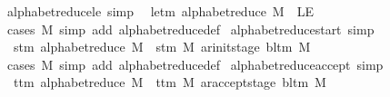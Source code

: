 \begin{isabellebody}
\endisatagproof
{\isafoldproof}%
%
\isadelimproof
\isanewline
%
\endisadelimproof
\isanewline
{}\isamarkupfalse%
\ alphabet{\isacharunderscore}{\kern0pt}reduce{\isacharunderscore}{\kern0pt}le\ {\isacharbrackleft}{\kern0pt}simp{\isacharbrackright}{\kern0pt}{\isacharcolon}{\kern0pt}\isanewline
\ \ {\isachardoublequoteopen}le{\isacharunderscore}{\kern0pt}tm\ {\isacharparenleft}{\kern0pt}alphabet{\isacharunderscore}{\kern0pt}reduce\ M{\isacharparenright}{\kern0pt}\ {\isacharequal}{\kern0pt}\ LE{}{\isachardoublequoteclose}\isanewline
%
\isadelimproof
\ \ %
\endisadelimproof
%
\isatagproof
{}\isamarkupfalse%
\ {\isacharparenleft}{\kern0pt}cases\ M{\isacharparenright}{\kern0pt}\ {\isacharparenleft}{\kern0pt}simp\ add{\isacharcolon}{\kern0pt}\ alphabet{\isacharunderscore}{\kern0pt}reduce{\isacharunderscore}{\kern0pt}def{\isacharparenright}{\kern0pt}%
\endisatagproof
{\isafoldproof}%
%
\isadelimproof
\isanewline
%
\endisadelimproof
\isanewline
{}\isamarkupfalse%
\ alphabet{\isacharunderscore}{\kern0pt}reduce{\isacharunderscore}{\kern0pt}start\ {\isacharbrackleft}{\kern0pt}simp{\isacharbrackright}{\kern0pt}{\isacharcolon}{\kern0pt}\isanewline
\ \ {\isachardoublequoteopen}s{\isacharunderscore}{\kern0pt}tm\ {\isacharparenleft}{\kern0pt}alphabet{\isacharunderscore}{\kern0pt}reduce\ M{\isacharparenright}{\kern0pt}\ {\isacharequal}{\kern0pt}\ {\isacharparenleft}{\kern0pt}s{\isacharunderscore}{\kern0pt}tm\ M{\isacharcomma}{\kern0pt}\ ar{\isacharunderscore}{\kern0pt}init{\isacharunderscore}{\kern0pt}stage\ {\isacharparenleft}{\kern0pt}bl{\isacharunderscore}{\kern0pt}tm\ M{\isacharparenright}{\kern0pt}{\isacharparenright}{\kern0pt}{\isachardoublequoteclose}\isanewline
%
\isadelimproof
\ \ %
\endisadelimproof
%
\isatagproof
{}\isamarkupfalse%
\ {\isacharparenleft}{\kern0pt}cases\ M{\isacharparenright}{\kern0pt}\ {\isacharparenleft}{\kern0pt}simp\ add{\isacharcolon}{\kern0pt}\ alphabet{\isacharunderscore}{\kern0pt}reduce{\isacharunderscore}{\kern0pt}def{\isacharparenright}{\kern0pt}%
\endisatagproof
{\isafoldproof}%
%
\isadelimproof
\isanewline
%
\endisadelimproof
\isanewline
{}\isamarkupfalse%
\ alphabet{\isacharunderscore}{\kern0pt}reduce{\isacharunderscore}{\kern0pt}accept\ {\isacharbrackleft}{\kern0pt}simp{\isacharbrackright}{\kern0pt}{\isacharcolon}{\kern0pt}\isanewline
\ \ {\isachardoublequoteopen}t{\isacharunderscore}{\kern0pt}tm\ {\isacharparenleft}{\kern0pt}alphabet{\isacharunderscore}{\kern0pt}reduce\ M{\isacharparenright}{\kern0pt}\ {\isacharequal}{\kern0pt}\ {\isacharparenleft}{\kern0pt}t{\isacharunderscore}{\kern0pt}tm\ M{\isacharcomma}{\kern0pt}\ ar{\isacharunderscore}{\kern0pt}accept{\isacharunderscore}{\kern0pt}stage\ {\isacharparenleft}{\kern0pt}bl{\isacharunderscore}{\kern0pt}tm\ M{\isacharparenright}{\kern0pt}{\isacharparenright}{\kern0pt}{\isachardoublequoteclose}\isanewline

\end{isabellebody}

